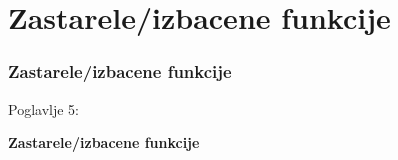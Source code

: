 %

\section{Zastarele/izbacene funkcije}
\begin{frame}[fragile]
	\frametitle{Zastarele/izbacene funkcije}

	\begin{center}\huge{Poglavlje 5:}\end{center}
	\begin{center}\huge{\color{typo3darkgrey}\textbf{Zastarele/izbacene funkcije}}\end{center}

\end{frame}

